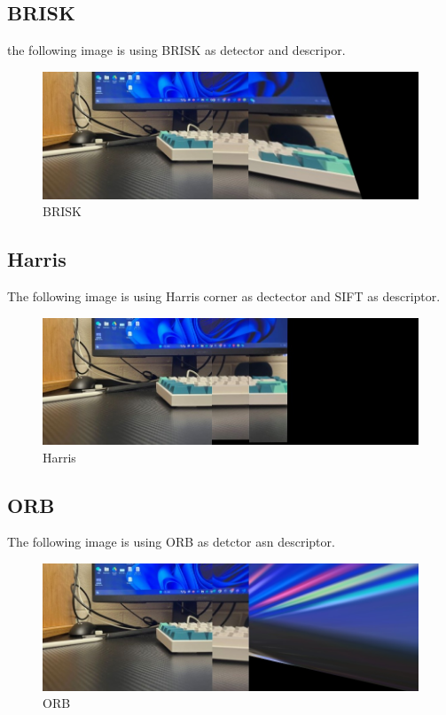 \documentclass{article}
\begin{document}
\subsection*{BRISK}
the following image is using BRISK as detector and descripor.
\begin{figure}[ht!]
  \begin{center}
    \includegraphics[scale=0.4]{BRISK-result.jpg}
    \caption[short]{BRISK}
    \label{fig:brisk}
  \end{center} 
\end{figure}
\subsection*{Harris}
The following image is using Harris corner as dectector and SIFT as descriptor.
\begin{figure}[ht!]
  \begin{center}
    \includegraphics[scale=0.4]{Harris-result.jpg}
    \caption[short]{Harris}
    \label{fig:harris}
  \end{center} 
\end{figure}

\subsection*{ORB}
The following image is using ORB as detctor asn descriptor.
\begin{figure}[ht!]
  \begin{center}
    \includegraphics[scale=0.4]{ORB-result.jpg}
    \caption[short]{ORB}
    \label{fig:orb}
  \end{center} 
\end{figure}
\end{document}
